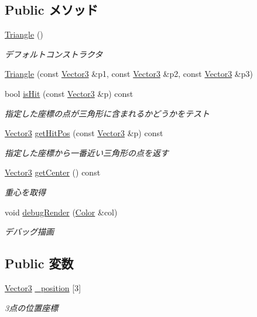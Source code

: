 \subsection*{Public メソッド}
\begin{DoxyCompactItemize}
\item 
\hyperlink{struct_triangle_aaefe4ed500c07918d30c6f0e286332c5}{Triangle} ()
\begin{DoxyCompactList}\small\item\em デフォルトコンストラクタ \end{DoxyCompactList}\item 
\hyperlink{struct_triangle_accd0422f7fc2f2f22c6c2042e76982f1}{Triangle} (const \hyperlink{struct_vector3}{Vector3} \&p1, const \hyperlink{struct_vector3}{Vector3} \&p2, const \hyperlink{struct_vector3}{Vector3} \&p3)
\item 
bool \hyperlink{struct_triangle_adbf10eb0436ab91581f6da857b203d1f}{is\-Hit} (const \hyperlink{struct_vector3}{Vector3} \&p) const 
\begin{DoxyCompactList}\small\item\em 指定した座標の点が三角形に含まれるかどうかをテスト \end{DoxyCompactList}\item 
\hyperlink{struct_vector3}{Vector3} \hyperlink{struct_triangle_ae2d9ae35e53b8c1654e7f5405b8e26dd}{get\-Hit\-Pos} (const \hyperlink{struct_vector3}{Vector3} \&p) const 
\begin{DoxyCompactList}\small\item\em 指定した座標から一番近い三角形の点を返す \end{DoxyCompactList}\item 
\hyperlink{struct_vector3}{Vector3} \hyperlink{struct_triangle_a6298642f5b3796035806fdec1f5584f9}{get\-Center} () const 
\begin{DoxyCompactList}\small\item\em 重心を取得 \end{DoxyCompactList}\item 
void \hyperlink{struct_triangle_ad963391905b9b061f1bbb69dce87494e}{debug\-Render} (\hyperlink{struct_color}{Color} \&col)
\begin{DoxyCompactList}\small\item\em デバッグ描画 \end{DoxyCompactList}\end{DoxyCompactItemize}
\subsection*{Public 変数}
\begin{DoxyCompactItemize}
\item 
\hyperlink{struct_vector3}{Vector3} \hyperlink{struct_triangle_a2138d57a641e85b40dfb79dbbb14f733}{\-\_\-position} \mbox{[}3\mbox{]}
\begin{DoxyCompactList}\small\item\em 3点の位置座標 \end{DoxyCompactList}\end{DoxyCompactItemize}


